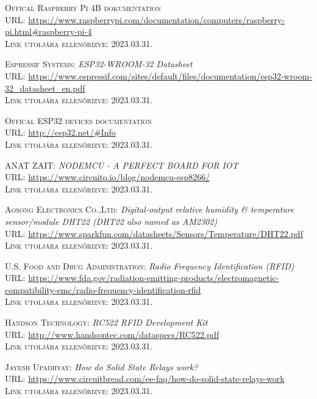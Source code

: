 \documentclass[
]{thesis-ekf}
\theoremstyle{definition}
\theoremstyle{remark}
\begin{document}
\begin{thebibliography}{20}
		\textsc{Offical Raspberry Pi 4B dokumentation}\\
		\textsc{URL:} \url{https://www.raspberrypi.com/documentation/computers/raspberry-pi.html#raspberry-pi-4}\\
		\textsc{Link utoljára ellenőrizve:} 2023.03.31.
		
		\textsc{Espressif Systems:} \emph{ESP32­-WROOM-­32 Datasheet}\\
		\textsc{URL:} \url{https://www.espressif.com/sites/default/files/documentation/esp32-wroom-32_datasheet_en.pdf}\\
		\textsc{Link utoljára ellenőrizve:} 2023.03.31.
		
		\textsc{Offical ESP32 devices documentation}\\
		\textsc{URL:} \url{http://esp32.net/#Info}\\
		\textsc{Link utoljára ellenőrizve:} 2023.03.31.
		
		\textsc{ANAT ZAIT:} \emph{NODEMCU - A PERFECT BOARD FOR IOT}\\
		\textsc{URL:} \url{https://www.circuito.io/blog/nodemcu-esp8266/}\\
		\textsc{Link utoljára ellenőrizve:} 2023.03.31.
		
		\textsc{Aosong Electronics Co.,Ltd:} \emph{Digital-output relative humidity \& temperature sensor/module DHT22 (DHT22 also named as AM2302)}\\
		\textsc{URL:} \url{https://www.sparkfun.com/datasheets/Sensors/Temperature/DHT22.pdf}\\
		\textsc{Link utoljára ellenőrizve:} 2023.03.31.
		
		\textsc{U.S. Food and Drug Administration:} \emph{Radio Frequency Identification (RFID)}\\
		\textsc{URL:} \url{https://www.fda.gov/radiation-emitting-products/electromagnetic-compatibility-emc/radio-frequency-identification-rfid}\\
		\textsc{Link utoljára ellenőrizve:} 2023.03.31.
		
		\textsc{Handson Technology:} \emph{RC522 RFID Development Kit}\\
		\textsc{URL:} \url{http://www.handsontec.com/dataspecs/RC522.pdf}\\
		\textsc{Link utoljára ellenőrizve:} 2023.03.31.
		
		\textsc{Jayesh Upadhyay:} \emph{How do Solid State Relays work?}\\
		\textsc{URL:} \url{https://www.circuitbread.com/ee-faq/how-do-solid-state-relays-work}\\
		\textsc{Link utoljára ellenőrizve:} 2023.03.31.
		

\end{thebibliography}
\end{document}
